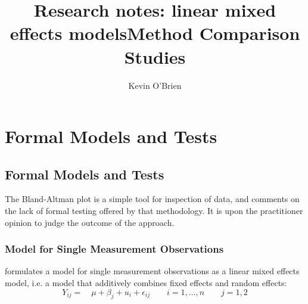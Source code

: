 \documentclass[12pt, a4paper]{report}
\title{Research notes: linear mixed effects models}
\author{ } \date{ }
\theoremstyle{plain}
\theoremstyle{definition}
\theoremstyle{remark}
\begin{document}
	\author{Kevin O'Brien}
	\title{Method Comparison Studies}
	
	
	\tableofcontents
	
	
	
	
\chapter{Formal Models and Tests}


\section{Formal Models and Tests}
The Bland-Altman plot is a simple tool for inspection of data, and
\citet{Kinsella} comments on the lack of formal testing offered by
that methodology. It is upon the practitioner opinion to judge the outcome of the approach. 

\subsection{Model for Single Measurement Observations}
\citet{kinsella} formulates a model for
single measurement observations as a
linear mixed effects model, i.e. a model that additively combines
fixed effects and random effects:
\[
Y_{ij} =\quad \mu + \beta_{j} + u_{i} + \epsilon_{ij} \qquad i = 1,\dots,n
\qquad j=1,2\]
\end{document}
